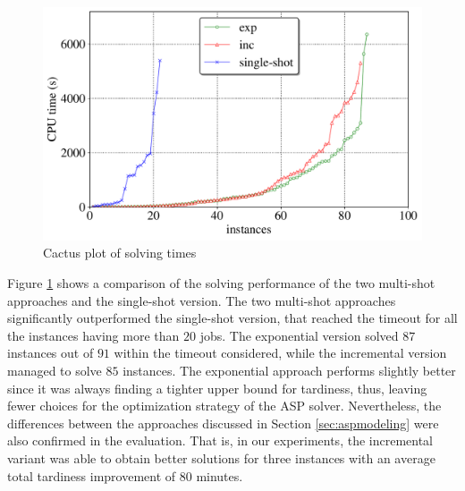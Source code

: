 \documentclass[submission,copyright,creativecommons]{eptcs}
\begin{document}
\begin{figure}[b]
	\centering
	
	\includegraphics[width=0.75\linewidth]{figures/cactus_time_font20.pdf}
	\caption{Cactus plot of solving times \label{fig:cactus:time}}
	  
\end{figure}

Figure \ref{fig:cactus:time} shows a comparison of the solving performance of the two multi-shot approaches and the single-shot version. %
%
The two multi-shot approaches significantly outperformed the single-shot version, that reached the timeout for all the instances having more than $20$ jobs. The exponential version solved $87$ instances out of $91$ within the timeout considered, while the incremental version managed to solve $85$ instances. The exponential approach performs slightly better since it was always finding a tighter upper bound for tardiness, thus, leaving fewer choices for the optimization strategy of the ASP solver. Nevertheless, the differences between the approaches discussed in Section \ref{sec:aspmodeling} were also confirmed in the evaluation. That is, in our experiments, the incremental variant was able to obtain better solutions for three instances with an average total tardiness improvement of 80 minutes.

\nocite{*}


\end{document}
